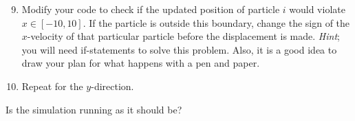 \documentclass{article}
\begin{document}
\begin{enumerate}
  \setcounter{enumi}{8}
  \item Modify your code to check if the updated position of particle $i$ would violate $x \in [-10,10]$.
      If the particle is outside this boundary, change the sign of the $x$-velocity of that
      particular particle before the displacement is made.
      {\em Hint}; you will need if-statements to solve this problem. Also, it is a good idea to draw your plan for what happens with a pen and paper.

  \item Repeat for the $y$-direction.

\end{enumerate}

Is the simulation running as it should be?

\end{document}
